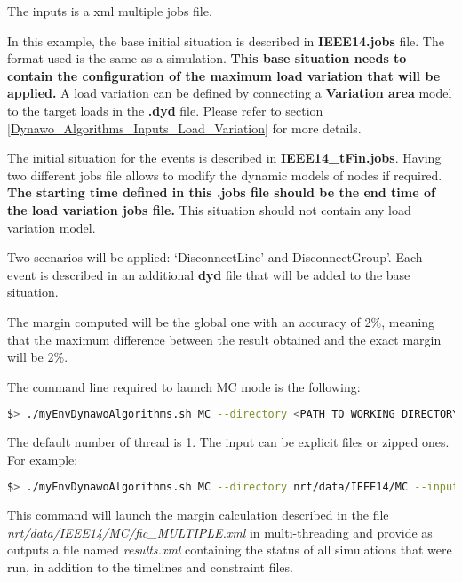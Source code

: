 \documentclass[a4paper, 12pt]{report}
\begin{document}
The inputs is a xml multiple jobs file.



In this example, the base initial situation is described in \textbf{IEEE14.jobs} file. The format used is the same as a \Dynawo simulation.
\textbf{This base situation needs to contain the configuration of the maximum load variation that will be applied.}
A load variation can be defined by connecting a \textbf{Variation area} model to the target loads in the \textbf{.dyd} file. 
Please refer to section \ref{Dynawo_Algorithms_Inputs_Load_Variation} for more details.

The initial situation for the events is described in \textbf{IEEE14\_tFin.jobs}. Having two different jobs file allows to modify the dynamic models of nodes if required. 
\textbf{The starting time defined in this .jobs file should be the end time of the load variation jobs file.}
This situation should not contain any load variation model. 

Two scenarios will be applied: `DisconnectLine' and DisconnectGroup'. 
Each event is described in an additional \textbf{dyd} file that will be added to the base situation. 

The margin computed will be the global one with an accuracy of 2\%, meaning that the maximum difference between the result obtained and the exact margin will be 2\%.

The command line required to launch MC mode is the following:

\begin{lstlisting}[language=bash, breaklines=true, breakatwhitespace=false]
$> ./myEnvDynawoAlgorithms.sh MC --directory <PATH TO WORKING DIRECTORY> --input <NAME OF INPUT FILE> --output <NAME OF OUTPUT FILE> --nbThreads <NUMBER OF THREADS>
\end{lstlisting}

The default number of thread is 1. The input can be explicit files or zipped ones. For example:

\begin{lstlisting}[language=bash, breaklines=true, breakatwhitespace=false]
$> ./myEnvDynawoAlgorithms.sh MC --directory nrt/data/IEEE14/MC --input fic_MULTIPLE.xml --output results.xml --nbThreads 2
\end{lstlisting}

This command will launch the margin calculation described in the file \textit{nrt/data/IEEE14/MC/fic\_MULTIPLE.xml} in multi-threading 
and provide as outputs a file named \textit{results.xml} containing the status of all simulations that were run, 
in addition to the timelines and constraint files.\\
\end{document}
